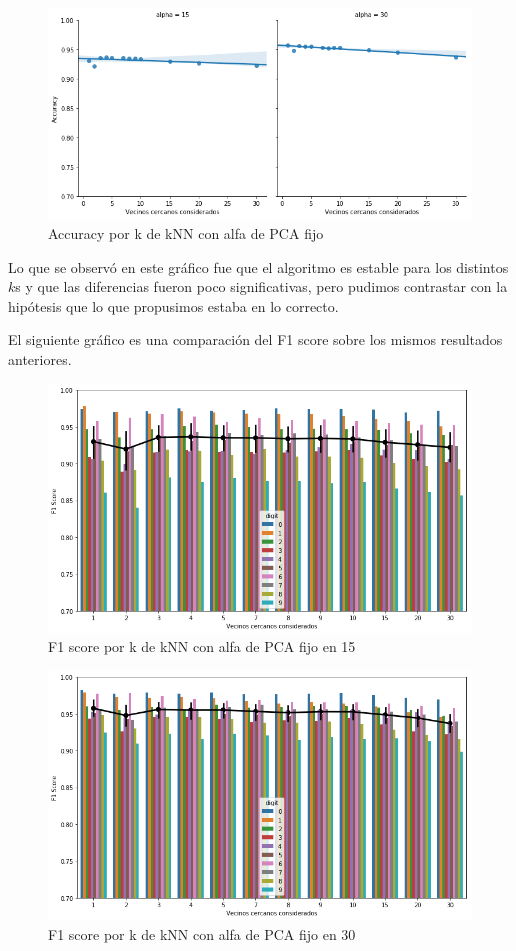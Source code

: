 \begin{figure}[H]
    \begin{center}
      \includegraphics[width=0.8\columnwidth]{imagenes/Accuracy_15_30.png}
      \caption{Accuracy por k de kNN con alfa de PCA fijo}
    \end{center}
\end{figure}

Lo que se observó en este gráfico fue que el algoritmo es estable para los distintos $k$s y que las diferencias fueron poco significativas, pero pudimos contrastar con la hipótesis que lo que propusimos estaba en lo correcto.

El siguiente gráfico es una comparación del F1 score sobre los mismos resultados anteriores.

\begin{figure}[H]
    \begin{center}
      \includegraphics[width=0.8\columnwidth]{imagenes/F1_alpha_15.png}
      \caption{F1 score por k de kNN con alfa de PCA fijo en 15}
    \end{center}
\end{figure}

\begin{figure}[H]
    \begin{center}
      \includegraphics[width=0.8\columnwidth]{imagenes/F1_alpha_30.png}
      \caption{F1 score por k de kNN con alfa de PCA fijo en 30}
    \end{center}
\end{figure}

